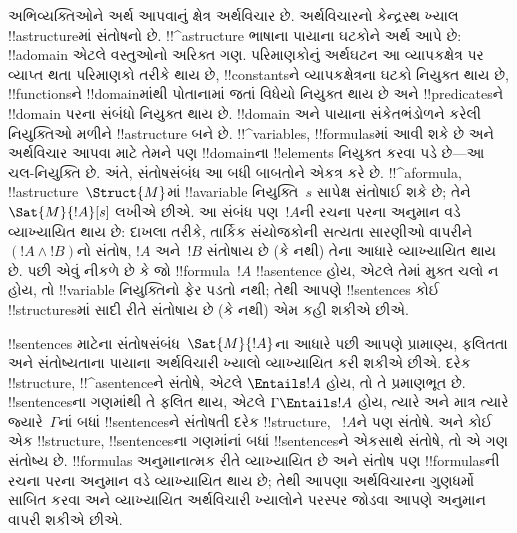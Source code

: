\documentclass[../../../include/open-logic-section]{subfiles}
\begin{document}


અભિવ્યક્તિઓને અર્થ આપવાનું ક્ષેત્ર અર્થવિચાર છે. અર્થવિચારનો કેન્દ્રસ્થ
ખ્યાલ !!a{structure}માં સંતોષનો છે. !!^a{structure} ભાષાના પાયાના
ઘટકોને અર્થ આપે છે: !!a{domain} એટલે વસ્તુઓનો અરિક્ત ગણ. પરિમાણકોનું
અર્થઘટન આ વ્યાપકક્ષેત્ર પર વ્યાપ્ત થતા પરિમાણકો તરીકે થાય છે, !!{constant}sને
વ્યાપકક્ષેત્રના ઘટકો નિયુક્ત થાય છે, !!{function}sને !!{domain}માંથી પોતાનામાં
જતાં વિધેયો નિયુક્ત થાય છે અને !!{predicate}sને !!{domain} પરના સંબંધો
નિયુક્ત થાય છે. !!{domain} અને પાયાના સંકેતભંડોળને કરેલી નિયુક્તિઓ
મળીને !!a{structure} બને છે. !!^{variable}s, !!{formula}sમાં આવી શકે
છે અને અર્થવિચાર આપવા માટે તેમને પણ !!{domain}ના !!{element}s નિયુક્ત
કરવા પડે છે---આ ચલ-નિયુક્તિ છે. અંતે, સંતોષસંબંધ આ બધી બાબતોને એકત્ર
કરે છે. !!^a{formula}, !!a{structure}~$\Struct{M}$માં
!!a{variable} નિયુક્તિ~$s$ સાપેક્ષ સંતોષાઈ શકે છે; તેને
$\Sat{M}{!A}[s]$ લખીએ છીએ. આ સંબંધ પણ~$!A$ની રચના પરના અનુમાન વડે
વ્યાખ્યાયિત થાય છે: દાખલા તરીકે, તાર્કિક સંયોજકોની સત્યતા સારણીઓ
વાપરીને $(!A \land !B)$નો સંતોષ, $!A$ અને~$!B$ સંતોષાય છે (કે નથી)
તેના આધારે વ્યાખ્યાયિત થાય છે. પછી એવું નીકળે છે કે જો
!!{formula}~$!A$ !!a{sentence} હોય, એટલે તેમાં મુક્ત ચલો ન હોય, તો
!!{variable} નિયુક્તિનો ફેર પડતો નથી; તેથી આપણે !!{sentence}s કોઈ
!!{structure}sમાં સાદી રીતે સંતોષાય છે (કે નથી) એમ કહી શકીએ છીએ.

!!{sentence}s માટેના સંતોષસંબંધ~$\Sat{M}{!A}$ના આધારે પછી આપણે
પ્રામાણ્ય, ફલિતતા અને સંતોષ્યતાના પાયાના અર્થવિચારી ખ્યાલો
વ્યાખ્યાયિત કરી શકીએ છીએ. દરેક !!{structure}, !!^a{sentence}ને સંતોષે,
એટલે $\Entails !A$ હોય, તો તે પ્રમાણભૂત છે. !!{sentence}sના ગણમાંથી
તે ફલિત થાય, એટલે $\Gamma \Entails !A$ હોય, ત્યારે અને માત્ર ત્યારે
જ્યારે~$\Gamma$નાં બધાં !!{sentence}sને સંતોષતી દરેક !!{structure},
~$!A$ને પણ સંતોષે. અને કોઈ એક !!{structure}, !!{sentence}sના ગણમાંનાં
બધાં !!{sentence}sને એકસાથે સંતોષે, તો એ ગણ સંતોષ્ય છે. !!{formula}s
અનુમાનાત્મક રીતે વ્યાખ્યાયિત છે અને સંતોષ પણ !!{formula}sની રચના પરના
અનુમાન વડે વ્યાખ્યાયિત થાય છે; તેથી આપણા અર્થવિચારના ગુણધર્મો સાબિત
કરવા અને વ્યાખ્યાયિત અર્થવિચારી ખ્યાલોને પરસ્પર જોડવા આપણે અનુમાન
વાપરી શકીએ છીએ.
\end{document}

